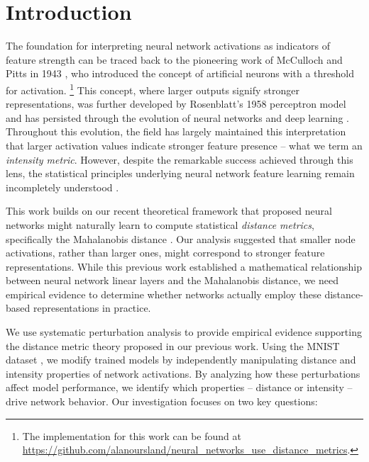 \section{Introduction}

The foundation for interpreting neural network activations as indicators of feature strength can be traced back to the pioneering work of McCulloch and Pitts in 1943 \citep{mcculloch1943logical}, who introduced the concept of artificial neurons with a threshold for activation. \footnote{The implementation for this work can be found at \url{https://github.com/alanoursland/neural_networks_use_distance_metrics}.} This concept, where larger outputs signify stronger representations, was further developed by Rosenblatt's 1958 perceptron model \citep{rosenblatt1958perceptron} and has persisted through the evolution of neural networks and deep learning \citep{schmidhuber2015deep}. Throughout this evolution, the field has largely maintained this interpretation that larger activation values indicate stronger feature presence -- what we term an \emph{intensity metric}. However, despite the remarkable success achieved through this lens, the statistical principles underlying neural network feature learning remain incompletely understood \citep{lipton2018mythos}.

This work builds on our recent theoretical framework \citep{oursland2024interpreting} that proposed neural networks might naturally learn to compute statistical \emph{distance metrics}, specifically the Mahalanobis distance \citep{mahalanobis1936generalized}. Our analysis suggested that smaller node activations, rather than larger ones, might correspond to stronger feature representations. While this previous work established a mathematical relationship between neural network linear layers and the Mahalanobis distance, we need empirical evidence to determine whether networks actually employ these distance-based representations in practice.

We use systematic perturbation analysis \citep{szegedy2013intriguing, goodfellow2014explaining} to provide empirical evidence supporting the distance metric theory proposed in our previous work. Using the MNIST dataset \citep{lecun1998gradient}, we modify trained models by independently manipulating distance and intensity properties of network activations. By analyzing how these perturbations affect model performance, we identify which properties -- distance or intensity -- drive network behavior. Our investigation focuses on two key questions:

